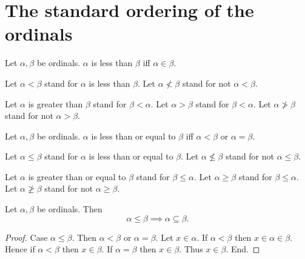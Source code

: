\documentclass[../../set-theory/set-theory.tex]{subfiles}
\begin{document}
  \section{The standard ordering of the ordinals}

  \begin{forthel}
    \begin{definition}
      Let $\alpha, \beta$ be ordinals.
      $\alpha$ is less than $\beta$ iff $\alpha \in \beta$.
    \end{definition}

    Let $\alpha < \beta$ stand for $\alpha$ is less than $\beta$.
    Let $\alpha \nless \beta$ stand for not $\alpha < \beta$.

    Let $\alpha$ is greater than $\beta$ stand for $\beta < \alpha$.
    Let $\alpha > \beta$ stand for $\beta < \alpha$.
    Let $\alpha \ngtr \beta$ stand for not $\alpha > \beta$.
  \end{forthel}

  \begin{forthel}
    \begin{definition}
      Let $\alpha, \beta$ be ordinals.
      $\alpha$ is less than or equal to $\beta$ iff $\alpha < \beta$ or
      $\alpha = \beta$.
    \end{definition}

    Let $\alpha \leq \beta$ stand for $\alpha$ is less than or equal to $\beta$.
    Let $\alpha \nleq \beta$ stand for not $\alpha \leq \beta$.

    Let $\alpha$ is greater than or equal to $\beta$ stand for
    $\beta \leq \alpha$.
    Let $\alpha \geq \beta$ stand for $\beta \leq \alpha$.
    Let $\alpha \ngeq \beta$ stand for not $\alpha \geq \beta$.
  \end{forthel}

  \begin{forthel}
    \begin{proposition}
      Let $\alpha, \beta$ be ordinals.
      Then \[ \alpha \leq \beta \implies \alpha \subseteq \beta. \]
    \end{proposition}
    \begin{proof}
      Case $\alpha \leq \beta$.
        Then $\alpha < \beta$ or $\alpha = \beta$.
        Let $x \in \alpha$.
        If $\alpha < \beta$ then $x \in \alpha \in \beta$.
        Hence if $\alpha < \beta$ then $x \in \beta$.
        If $\alpha = \beta$ then $x \in \beta$.
        Thus $x \in \beta$.
      End.
    \end{proof}
  \end{forthel}
\end{document}
